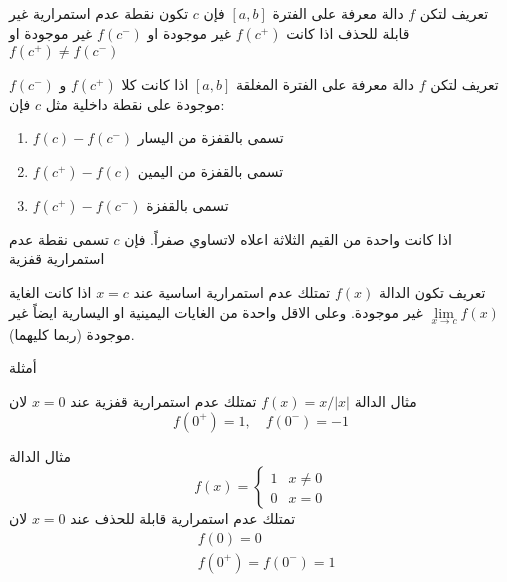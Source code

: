 	\begin{frame}
		\begin{exampleblock}{تعريف}
				لتكن $f$ دالة معرفة على الفترة $[a, b]$ فإن $c$ تكون نقطة عدم استمرارية غير قابلة للحذف اذا كانت $f(c^+)$ غير موجودة او $f(c^-)$ غير موجودة او $f(c^+) \neq f(c^-)$
		\end{exampleblock}
		
		\pause
		\begin{exampleblock}{تعريف}
				لتكن $f$ دالة معرفة على الفترة المغلقة $[a, b]$ اذا كانت كلا $f(c^+)$ و $f(c^-)$ موجودة على نقطة داخلية مثل $c$ فإن:
			\begin{enumerate}
				\item $f(c) - f(c^-)$ تسمى بالقفزة من اليسار 
				\item  $f(c^+) - f(c)$ تسمى بالقفزة من اليمين
				\item $f(c^+) - f(c^-)$ تسمى بالقفزة
			\end{enumerate}
			اذا كانت واحدة من القيم الثلاثة اعلاه لاتساوي صفراً. فإن $c$ تسمى نقطة عدم استمرارية قفزية
			
			\pause
		\end{exampleblock}
		
		\begin{exampleblock}{تعريف}
			 	تكون الدالة $f(x)$ تمتلك عدم استمرارية اساسية 
			عند $x=c$ اذا كانت الغاية 
			$\lim\limits_{x\to c} f(x)$ غير موجودة. وعلى الاقل واحدة من الغايات اليمينية او اليسارية ايضاً غير موجودة (ربما كليهما).
		\end{exampleblock}
	\end{frame}
	
	\begin{frame}{أمثلة}
		\begin{exampleblock}{مثال}
				الدالة $f(x) = x/|x|$ تمتلك عدم استمرارية قفزية عند $x=0$ لان 
			\[
			f(0^+) = 1,\quad f(0^-) = -1
			\]
		\end{exampleblock}
		
		\pause
		\begin{exampleblock}{مثال}
				الدالة
			\[
			f(x) =
			\begin{cases}
				1 & x\neq0 \\
				0 & x=0
			\end{cases}
			\]
			تمتلك عدم استمرارية قابلة للحذف عند $x=0$ لان 
			\begin{align*}
				& f(0) = 0\\
				& f(0^+) = f(0^-) = 1
			\end{align*}
		\end{exampleblock}
	\end{frame}
	
